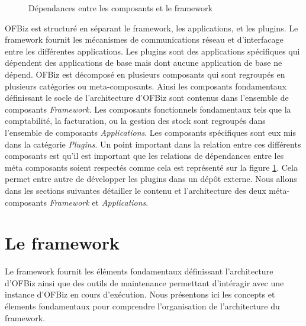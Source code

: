 \documentclass[a4paper, 11pt]{report}
\begin{document}
\begin{figure}
  \caption{Dépendances entre les composants et le framework}
  \label{fig:compdep}
\end{figure}

OFBiz est structuré en séparant le framework, les applications, et les
plugins. Le framework fournit les mécanismes de communications réseau
et d'interfacage entre les différentes applications. Les plugins sont
des applications spécifiques qui dépendent des applications de base
mais dont aucune application de base ne dépend.  OFBiz est décomposé
en plusieurs composants qui sont regroupés en plusieurs catégories ou
meta-composants. Ainsi les composants fondamentaux définissant le
socle de l'architecture d'OFBiz sont contenus dans l'ensemble de
composants \emph{Framework}. Les composants fonctionnels fondamentaux
tels que la comptabilité, la facturation, ou la gestion des stock sont
regroupés dans l'ensemble de composants \emph{Applications}. Les
composants spécifiques sont eux mis dans la catégorie
\emph{Plugins}. Un point important dans la relation entre ces
différents composants est qu'il est important que les relations de
dépendances entre les méta composants soient respectés comme cela est
représenté sur la figure \ref{fig:compdep}. Cela permet entre autre de
développer les plugins dans un dépôt externe. Nous allons dans les
sections suivantes détailler le contenu et l'architecture des deux
méta-composants \emph{Framework} et \emph{Applications}.

\section{Le framework}

Le framework fournit les éléments fondamentaux définissant
l'architecture d'OFBiz ainsi que des outils de maintenance permettant
d'intéragir avec une instance d'OFBiz en cours d'exécution. Nous
présentons ici les concepts et élements fondamentaux pour comprendre
l'organisation de l'architecture du framework.
\end{document}

